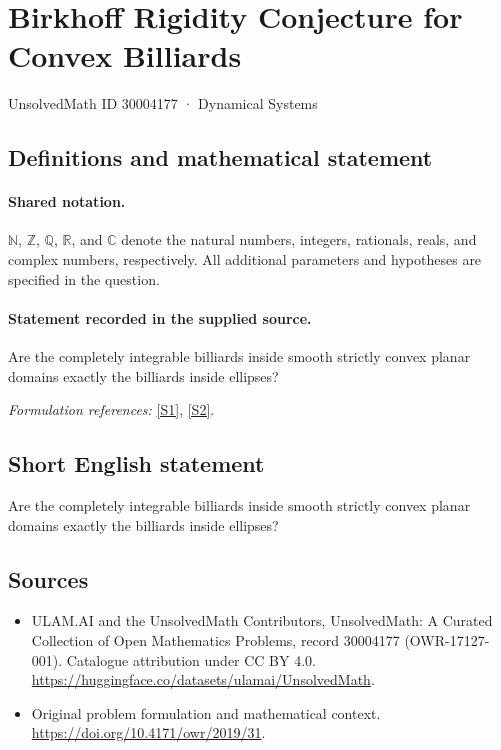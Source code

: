 \documentclass[11pt]{article}
\newcommand{\sref}[2]{\hyperlink{source:#1:#2}{[S#2]}}
\begin{document}
\setcounter{section}{30004176}
\section{Birkhoff Rigidity Conjecture for Convex Billiards}\label{30004177}
{\small UnsolvedMath ID 30004177 · Dynamical Systems}
\subsection{Definitions and mathematical statement}

\paragraph{Shared notation.}$\mathbb N$, $\mathbb Z$, $\mathbb Q$, $\mathbb R$, and $\mathbb C$ denote the natural numbers, integers, rationals, reals, and complex numbers, respectively. All additional parameters and hypotheses are specified in the question.


\paragraph{Statement recorded in the supplied source.}
Are the completely integrable billiards inside smooth strictly convex planar domains exactly the billiards inside ellipses?
\par\smallskip\textit{Formulation references:} \sref{30004177}{1}, \sref{30004177}{2}.
\subsection{Short English statement}
Are the completely integrable billiards inside smooth strictly convex planar domains exactly the billiards inside ellipses?
\subsection{Sources}
\begin{itemize}
\item[\hypertarget{source:30004177:1}{S1}] ULAM.AI and the UnsolvedMath Contributors, UnsolvedMath: A Curated Collection of Open Mathematics Problems, record 30004177 (OWR-17127-001). Catalogue attribution under CC BY 4.0.
\url{https://huggingface.co/datasets/ulamai/UnsolvedMath}.
\item[\hypertarget{source:30004177:2}{S2}] Original problem formulation and mathematical context.
\url{https://doi.org/10.4171/owr/2019/31}.
\end{itemize}
\label{end:30004177}
\end{document}
